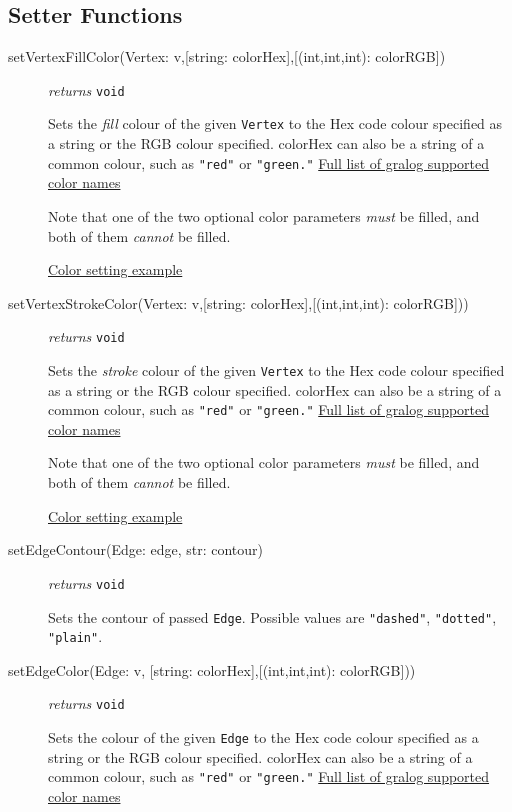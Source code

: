\documentclass{article}
\newcounter{example}
\begin{document}
\subsection{Setter Functions}
\begin{description}
\item[setVertexFillColor(Vertex: v,{[string: colorHex]},{[(int,int,int): colorRGB]})]\emph{returns}
  \texttt{void}

Sets the \textit{fill} colour of the given \texttt{Vertex} to the Hex code colour
specified as a string or the RGB colour specified. colorHex can also be
a string of a common colour, such as \texttt{"red"} or
\texttt{"green."} \hyperref[colorNamesSupportedByGralog]{Full list of gralog supported color names}

Note that one of the two optional color parameters \textit{must} be filled, and both of them \textit{cannot} be filled.

\hyperref[colorNamesSupportedByGralog]{Color setting example}

\item[setVertexStrokeColor(Vertex: v,{[string: colorHex]},{[(int,int,int): colorRGB]}))] \emph{returns} \texttt{void}

Sets the \textit{stroke} colour of the given \texttt{Vertex} to the Hex code colour
specified as a string or the RGB colour specified. colorHex can also be
a string of a common colour, such as \texttt{"red"} or
\texttt{"green."} \hyperref[colorNamesSupportedByGralog]{Full list of gralog supported color names}

Note that one of the two optional color parameters \textit{must} be filled, and both of them \textit{cannot} be filled.

\hyperref[colorNamesSupportedByGralog]{Color setting example}

\item[setEdgeContour(Edge: edge, str: contour)] \emph{returns}
\texttt{void}

Sets the contour of passed \texttt{Edge}. Possible values are
\texttt{"dashed"}, \texttt{"dotted"}, \texttt{"plain"}.

\item[setEdgeColor(Edge: v, {[string: colorHex]},{[(int,int,int): colorRGB]}))] \emph{returns} \texttt{void}

Sets the colour of the given \texttt{Edge} to the Hex code colour
specified as a string or the RGB colour specified. colorHex can also be
a string of a common colour, such as \texttt{"red"} or
\texttt{"green."} \hyperref[colorNamesSupportedByGralog]{Full list of gralog supported color names}


\end{description}
\end{document}
